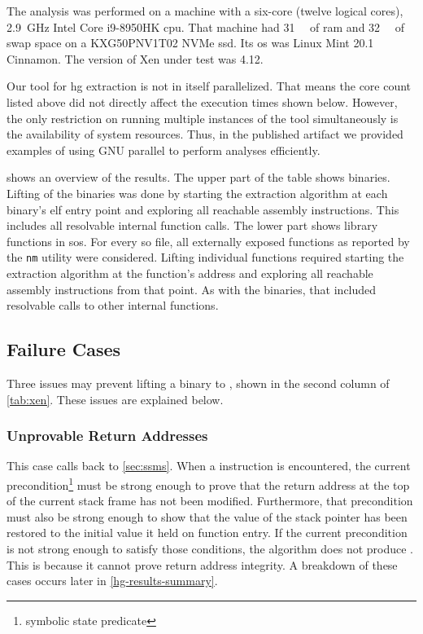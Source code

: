 The analysis was performed on a machine with a six-core (twelve logical cores), \SI{2.9}{\giga\hertz} Intel Core i9-8950HK \ac{cpu}.
That machine had \SI{31}{\gibi\byte} of \ac{ram}
and \SI{32}{\gibi\byte} of swap space on a KXG50PNV1T02 NVMe \ac{ssd}.
Its \ac{os} was Linux Mint 20.1 Cinnamon.
The version of Xen under test was 4.12.
\begin{remark}[Parallelization]
  Our tool for \ac{hg} extraction is not in itself parallelized.
  That means the core count listed above did not directly affect the execution times shown below.
  However, the only restriction on running multiple instances of the tool simultaneously is the availability of system resources.
  Thus, in the published artifact \autocite{bockenek2022artifact} we provided examples of using GNU parallel \autocite{Tange2011a} to perform analyses efficiently.
\end{remark}

 shows an overview of the results.
The upper part of the table shows binaries.
Lifting of the binaries was done by starting the extraction algorithm at each binary's \ac{elf} entry point and exploring all reachable assembly instructions.
This includes all resolvable internal function calls.
The lower part shows library functions in \acp{so}.
For every \ac{so} file, all externally exposed functions as reported by the \lstinline|nm| utility were considered.
Lifting individual functions required starting the extraction algorithm at the function's address and exploring all reachable assembly instructions from that point.
As with the binaries, that included resolvable calls to other internal functions.

\subsection{Failure Cases}\label{sec:failure}
Three issues may prevent lifting a binary to , shown in the second column of \cref{tab:xen}.
These issues are explained below.

\subsubsection{Unprovable Return Addresses}
This case calls back to \cref{sec:ssms}.
When a  instruction is encountered,
the current precondition\footnote{symbolic state predicate}
must be strong enough to prove that the return address at the top of the current stack frame has not been modified.
Furthermore, that precondition must also be strong enough to show that the value of the stack pointer has been restored to the initial value it held on function entry.
If the current precondition is not strong enough to satisfy those conditions, the algorithm does not produce .
This is because it cannot prove return address integrity.
A breakdown of these cases occurs later in \cref{hg-results-summary}.

